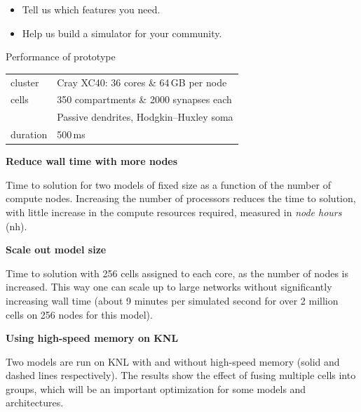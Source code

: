 \documentclass[a0paper,portrait]{baposter}
\newcommand{\imageheader}[1]{\begin{center}\bfseries\large{#1}\end{center} \vspace{-2pt}}
\newcommand{\newemph}[1]{{\color{blue!40!black}\em #1}}
\begin{document}
\begin{poster}
\begin{posterbox}
        \begin{itemize}\centering
            \item Tell us which features you need.
            \item Help us build a simulator for your community.
        \end{itemize}
\end{posterbox}

\begin{posterbox}[name=plots,column=2,below=help,span=1]{Performance of prototype}
        \colorbox[HTML]{FCF3CF}{%
            \begin{tabularx}{0.95\textwidth}{l|X}
                \footnotesize cluster
                    &\footnotesize Cray XC40: 36 cores \& 64\,GB per node\smallskip\\
                \footnotesize cells
                    &\footnotesize 350 compartments \& 2000 synapses each\\
                    &\footnotesize Passive dendrites, Hodgkin–Huxley soma\smallskip\\
                \footnotesize duration
                    &\footnotesize 500\,ms\smallskip\\
            \end{tabularx}
        }
    \vskip4pt
    \imageheader{Reduce wall time with more nodes}
    
    { \small
    Time to solution for two models of fixed size as a function of the number of compute nodes.
    Increasing the number of processors reduces the time to solution, with little increase in the compute resources required, measured in \newemph{node hours} (nh).
    }

    \imageheader{Scale out model size}
    
    { \small
    Time to solution with 256 cells assigned to each core, as the number of nodes is increased.
    This way one can scale up to large networks without significantly increasing wall time (about 9 minutes per simulated second for over 2 million cells on 256 nodes for this model).
    }

    \imageheader{Using high-speed memory on KNL}
    
    { \small
    Two models are run on KNL with and without high-speed memory (solid and dashed lines respectively).
    The results show the effect of fusing multiple cells into groups, which will be an important optimization for some models and architectures.
    }

\end{posterbox}

\end{poster}
\end{document}

